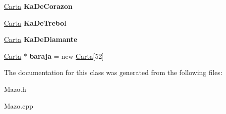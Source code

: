 \begin{DoxyCompactItemize}
\item 
\hypertarget{class_mazo_a2873cbcfd79ae9eb3d1cef8ba8d479eb}{\hyperlink{class_carta}{Carta} {\bfseries Ka\+De\+Corazon}}\label{class_mazo_a2873cbcfd79ae9eb3d1cef8ba8d479eb}

\item 
\hypertarget{class_mazo_ae238f04b4a48f17f09b0e4b7836d1ba2}{\hyperlink{class_carta}{Carta} {\bfseries Ka\+De\+Trebol}}\label{class_mazo_ae238f04b4a48f17f09b0e4b7836d1ba2}

\item 
\hypertarget{class_mazo_a5fa399e4acf7bade6e47ece0b4d4209b}{\hyperlink{class_carta}{Carta} {\bfseries Ka\+De\+Diamante}}\label{class_mazo_a5fa399e4acf7bade6e47ece0b4d4209b}

\item 
\hypertarget{class_mazo_adfe0b2a626537bb9139793f6668ab236}{\hyperlink{class_carta}{Carta} $\ast$ {\bfseries baraja} = new \hyperlink{class_carta}{Carta}\mbox{[}52\mbox{]}}\label{class_mazo_adfe0b2a626537bb9139793f6668ab236}

\end{DoxyCompactItemize}


The documentation for this class was generated from the following files\+:\begin{DoxyCompactItemize}
\item 
Mazo.\+h\item 
Mazo.\+cpp\end{DoxyCompactItemize}
